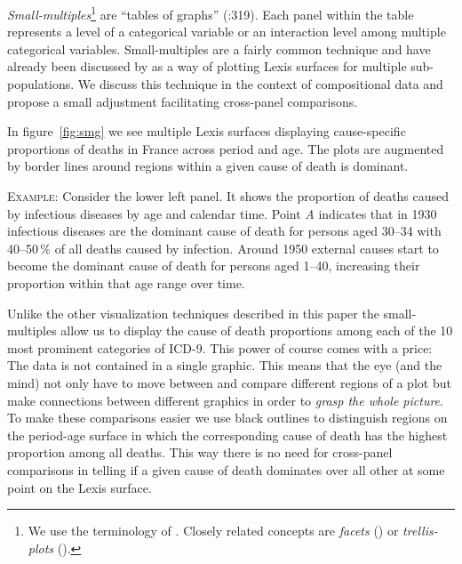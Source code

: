 \documentclass[parskip=half]{scrartcl}
\begin{document}
\emph{Small-multiples}\footnote{
  We use the terminology of \textcite{Tufte1990}. Closely related concepts are \emph{facets} (\cite{Wilkinson2005}) or \emph{trellis-plots} (\cite{Becker1996}).
}
are \enquote{tables of graphs} (\cite{Wilkinson2005}:319). Each panel within the table represents a level of a categorical variable or an interaction level among multiple categorical variables. Small-multiples are a fairly common technique and have already been discussed by \textcite{Vaupel1987} as a way of plotting Lexis surfaces for multiple sub-populations. We discuss this technique in the context of compositional data and propose a small adjustment facilitating cross-panel comparisons.

In figure~\ref{fig:smg} we see multiple Lexis surfaces displaying cause-specific proportions of deaths in France across period and age. The plots are augmented by border lines around regions within a given cause of death is dominant.

\textsc{Example:} Consider the lower left panel. It shows the proportion of deaths caused by infectious diseases by age and calendar time. Point \emph{A} indicates that in 1930 infectious diseases are the dominant cause of death for persons aged 30--34 with 40--50\,\% of all deaths caused by infection. Around 1950 external causes start to become the dominant cause of death for persons aged 1--40, increasing their proportion within that age range over time.

Unlike the other visualization techniques described in this paper the small-multiples allow us to display the cause of death proportions among each of the 10 most prominent categories of ICD-9. This power of course comes with a price: The data is not contained in a single graphic. This means that the eye (and the mind) not only have to move between and compare different regions of a plot but make connections between different graphics in order to \emph{grasp the whole picture}. To make these comparisons easier we use black outlines to distinguish regions on the period-age surface in which the corresponding cause of death has the highest proportion among all deaths. This way there is no need for cross-panel comparisons in telling if a given cause of death dominates over all other at some point on the Lexis surface.
\end{document}
